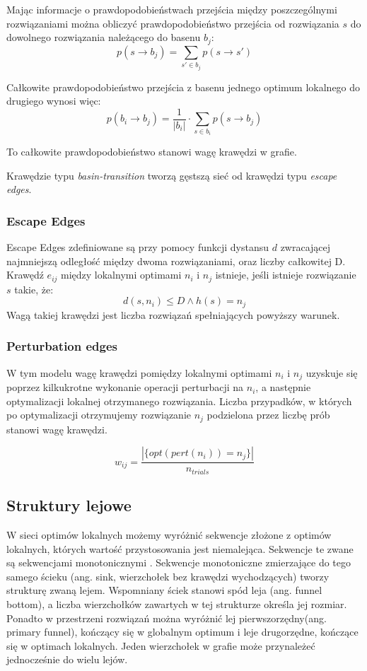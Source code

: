 Mając informacje o prawdopodobieństwach przejścia między poszczególnymi rozwiązaniami można obliczyć prawdopodobieństwo
przejścia od rozwiązania $s$ do dowolnego rozwiązania należącego do basenu $b_j$:
$$p(s \rightarrow b_j) = \sum_{s'\in{b_j}} p(s \rightarrow s')$$

Całkowite prawdopodobieństwo przejścia z basenu jednego optimum lokalnego do drugiego wynosi więc:
$$p(b_i \rightarrow b_j) = \frac{1}{|b_i|} \cdot \sum_{s\in{b_i}} p(s \rightarrow b_j)$$

To całkowite prawdopodobieństwo stanowi wagę krawędzi w grafie.

Krawędzie typu \textit{basin-transition} tworzą gęstszą sieć od krawędzi typu \textit{escape edges}.

\subsubsection*{Escape Edges}
Escape Edges zdefiniowane są przy pomocy funkcji dystansu $d$ zwracającej najmniejszą odległość między dwoma rozwiązaniami,
oraz liczby całkowitej D.
Krawędź $e_{ij}$ między lokalnymi optimami $n_i$ i $n_j$ istnieje, jeśli istnieje rozwiązanie $s$ takie, że:
\begin{equation}
      \label{eq:escape_edge_cond}
      d(s, n_i) \leq D \land h(s)=n_j
\end{equation}
Wagą takiej krawędzi jest liczba rozwiązań spełniających powyższy warunek.

\subsubsection{Perturbation edges}
W tym modelu wagę krawędzi pomiędzy lokalnymi optimami $n_i$ i $n_j$ uzyskuje się poprzez kilkukrotne wykonanie
operacji perturbacji na $n_i$, a następnie optymalizacji lokalnej otrzymanego rozwiązania.
Liczba przypadków, w których po optymalizacji otrzymujemy rozwiązanie $n_j$ podzielona przez liczbę prób stanowi wagę krawędzi.

$$
      w_{ij} = \frac{ |\{opt(pert(n_i)) = n_j\}| }{n_{trials}}
$$

\subsection{Struktury lejowe}
W sieci optimów lokalnych możemy wyróżnić sekwencje złożone z optimów lokalnych, których wartość przystosowania jest niemalejąca.
Sekwencje te zwane są sekwencjami monotonicznymi \cite{DBLP:journals/heuristics/OchoaV18}.
Sekwencje monotoniczne zmierzające do tego samego ścieku (ang. sink, wierzchołek bez krawędzi wychodzących)
tworzy strukturę zwaną lejem. Wspomniany ściek stanowi spód leja (ang. funnel bottom), a liczba wierzchołków zawartych w tej strukturze określa jej rozmiar.
Ponadto w przestrzeni rozwiązań można wyróżnić lej pierwszorzędny(ang. primary funnel), kończący się w globalnym optimum i leje drugorzędne,
kończące się w optimach lokalnych. Jeden wierzchołek w grafie może przynależeć jednocześnie do wielu lejów.

